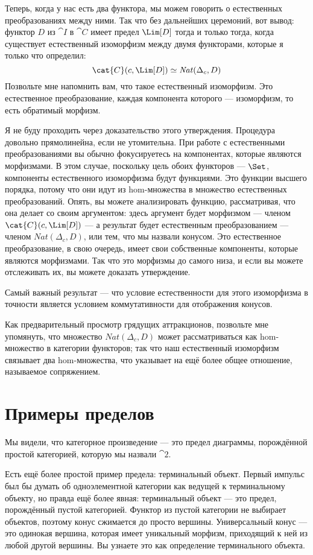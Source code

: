 Теперь, когда у нас есть два функтора, мы можем говорить о естественных преобразованиях
между ними. Так что без дальнейших церемоний, вот вывод: функтор
$D$ из $\cat{I}$ в $\cat{C}$ имеет предел $\Lim[D]$ тогда и
только тогда, когда существует естественный изоморфизм между двумя функторами, которые я только что
определил:
\[\cat{C}(c, \Lim[D]) \simeq \mathit{Nat}(\Delta_c, D)\]
Позвольте мне напомнить вам, что такое естественный изоморфизм. Это естественное
преобразование, каждая компонента которого --- изоморфизм, то есть
обратимый морфизм.

Я не буду проходить через доказательство этого утверждения. Процедура
довольно прямолинейна, если не утомительна. При работе с естественными
преобразованиями вы обычно фокусируетесь на компонентах, которые являются морфизмами.
В этом случае, поскольку цель обоих функторов --- $\Set$,
компоненты естественного изоморфизма будут функциями. Это
функции высшего порядка, потому что они идут из hom-множества в множество
естественных преобразований. Опять, вы можете анализировать функцию,
рассматривая, что она делает со своим аргументом: здесь аргумент будет
морфизмом --- членом $\cat{C}(c, \Lim[D])$ --- а результат будет
естественным преобразованием --- членом $\mathit{Nat}(\Delta_c, D)$, или
тем, что мы назвали конусом. Это естественное преобразование, в свою очередь, имеет
свои собственные компоненты, которые являются морфизмами. Так что это морфизмы до самого
низа, и если вы можете отслеживать их, вы можете доказать утверждение.

Самый важный результат --- что условие естественности для этого
изоморфизма в точности является условием коммутативности для отображения
конусов.

Как предварительный просмотр грядущих аттракционов, позвольте мне упомянуть, что множество
$\mathit{Nat}(\Delta_c, D)$ может рассматриваться как hom-множество в категории
функторов; так что наш естественный изоморфизм связывает два hom-множества, что указывает
на ещё более общее отношение, называемое сопряжением.

\section{Примеры пределов}

Мы видели, что категорное произведение --- это предел диаграммы,
порождённой простой категорией, которую мы назвали $\cat{2}$.

Есть ещё более простой пример предела: терминальный объект.
Первый импульс был бы думать об одноэлементной категории как ведущей к
терминальному объекту, но правда ещё более явная: терминальный
объект --- это предел, порождённый пустой категорией. Функтор из
пустой категории не выбирает объектов, поэтому конус сжимается до просто вершины.
Универсальный конус --- это одинокая вершина, которая имеет уникальный морфизм, приходящий к
ней из любой другой вершины. Вы узнаете это как определение
терминального объекта.

